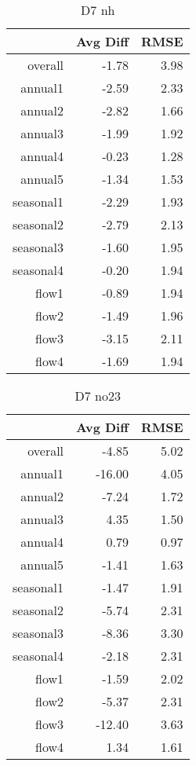 \begin{table}[H]
\centering
\begin{tabular}{rrr}
  \hline
 & Avg Diff & RMSE \\ 
  \hline
overall & -1.78 & 3.98 \\ 
  annual1 & -2.59 & 2.33 \\ 
  annual2 & -2.82 & 1.66 \\ 
  annual3 & -1.99 & 1.92 \\ 
  annual4 & -0.23 & 1.28 \\ 
  annual5 & -1.34 & 1.53 \\ 
  seasonal1 & -2.29 & 1.93 \\ 
  seasonal2 & -2.79 & 2.13 \\ 
  seasonal3 & -1.60 & 1.95 \\ 
  seasonal4 & -0.20 & 1.94 \\ 
  flow1 & -0.89 & 1.94 \\ 
  flow2 & -1.49 & 1.96 \\ 
  flow3 & -3.15 & 2.11 \\ 
  flow4 & -1.69 & 1.94 \\ 
   \hline
\end{tabular}
\caption{D7 nh} 
\end{table}
\begin{table}[H]
\centering
\begin{tabular}{rrr}
  \hline
 & Avg Diff & RMSE \\ 
  \hline
overall & -4.85 & 5.02 \\ 
  annual1 & -16.00 & 4.05 \\ 
  annual2 & -7.24 & 1.72 \\ 
  annual3 & 4.35 & 1.50 \\ 
  annual4 & 0.79 & 0.97 \\ 
  annual5 & -1.41 & 1.63 \\ 
  seasonal1 & -1.47 & 1.91 \\ 
  seasonal2 & -5.74 & 2.31 \\ 
  seasonal3 & -8.36 & 3.30 \\ 
  seasonal4 & -2.18 & 2.31 \\ 
  flow1 & -1.59 & 2.02 \\ 
  flow2 & -5.37 & 2.31 \\ 
  flow3 & -12.40 & 3.63 \\ 
  flow4 & 1.34 & 1.61 \\ 
   \hline
\end{tabular}
\caption{D7 no23} 
\end{table}
